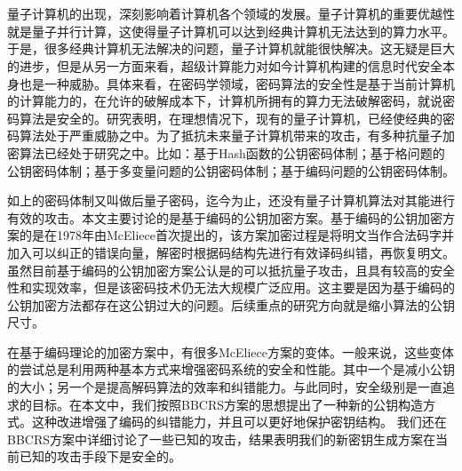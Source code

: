 \vspace{-2.5cm}
\chapter*{}
\vspace{-1cm}
量子计算机的出现，深刻影响着计算机各个领域的发展。量子计算机的重要优越性就是量子并行计算，这使得量子计算机可以达到经典计算机无法达到的算力水平。于是，很多经典计算机无法解决的问题，量子计算机就能很快解决。这无疑是巨大的进步，但是从另一方面来看，超级计算能力对如今计算机构建的信息时代安全本身也是一种威胁。具体来看，在密码学领域，密码算法的安全性是基于当前计算机的计算能力的，在允许的破解成本下，计算机所拥有的算力无法破解密码，就说密码算法是安全的。研究表明，在理想情况下，现有的量子计算机，已经使经典的密码算法处于严重威胁之中。为了抵抗未来量子计算机带来的攻击，有多种抗量子加密算法已经处于研究之中。比如：基于Hash函数的公钥密码体制；基于格问题的公钥密码体制；基于多变量问题的公钥密码体制；基于编码问题的公钥密码体制。

如上的密码体制又叫做后量子密码，迄今为止，还没有量子计算机算法对其能进行有效的攻击。本文主要讨论的是基于编码的公钥加密方案。基于编码的公钥加密方案的是在1978年由McEliece首次提出的\cite{Mceliece1978A}，该方案加密过程是将明文当作合法码字并加入可以纠正的错误向量，解密时根据码结构先进行有效译码纠错，再恢复明文。虽然目前基于编码的公钥加密方案公认是的可以抵抗量子攻击，且具有较高的安全性和实现效率，但是该密码技术仍无法大规模广泛应用。这主要是因为基于编码的公钥加密方法都存在这公钥过大的问题。后续重点的研究方向就是缩小算法的公钥尺寸。

在基于编码理论的加密方案中，有很多McEliece方案的变体\cite{Loidreau2001Weak}。一般来说，这些变体的尝试总是利用两种基本方式来增强密码系统的安全和性能。其中一个是减小公钥的大小；另一个是提高解码算法的效率和纠错能力。与此同时，安全级别是一直追求的目标。在本文中，我们按照BBCRS方案\cite{Baldi2011EnhancedPK}的思想提出了一种新的公钥构造方式。这种改进增强了编码的纠错能力，并且可以更好地保护密钥结构。 我们还在BBCRS方案中详细讨论了一些已知的攻击，结果表明我们的新密钥生成方案在当前已知的攻击手段下是安全的。


\hspace{-0.5cm}
 
